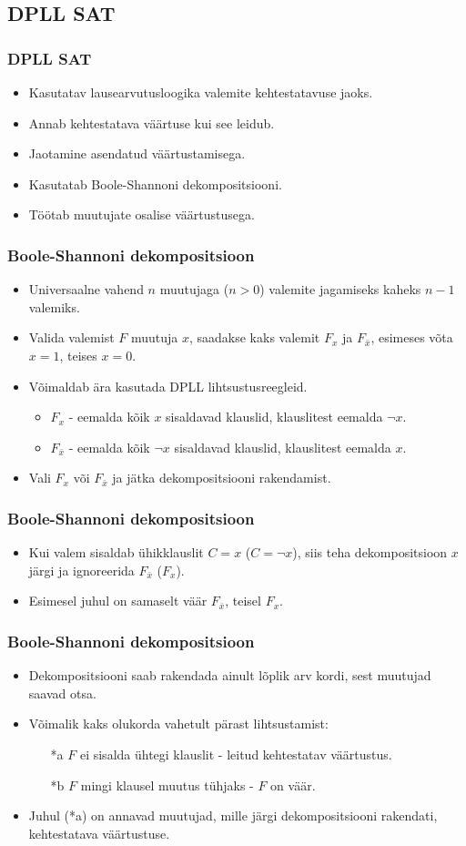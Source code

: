 \documentclass{beamer}
\begin{document}
\subsection{DPLL SAT}
\frame
{
	\frametitle{DPLL SAT}
	
	\begin{itemize}
		\item Kasutatav lausearvutusloogika valemite kehtestatavuse jaoks.
		\item Annab kehtestatava väärtuse kui see leidub.
		\item Jaotamine asendatud väärtustamisega.
		\item Kasutatab Boole-Shannoni dekompositsiooni.
		\item Töötab muutujate osalise väärtustusega.
	\end{itemize}
}
\frame
{
	\frametitle{Boole-Shannoni dekompositsioon}
	
	\begin{itemize}
		\item Universaalne vahend $n$ muutujaga ($n > 0$) valemite
		jagamiseks kaheks $n-1$ valemiks.
		\item Valida valemist $F$ muutuja $x$, saadakse kaks valemit $F_x$ ja $F_{\bar{x}}$,
		esimeses võta $x=1$, teises $x=0$.
		\item Võimaldab ära kasutada DPLL lihtsustusreegleid.
		\begin{itemize}
			\item $F_x$ - eemalda kõik $x$ sisaldavad klauslid, klauslitest eemalda $\neg x$.
			\item $F_{\bar{x}}$ - eemalda kõik $\neg x$ sisaldavad klauslid, klauslitest eemalda $x$.
		\end{itemize}
		\item Vali $F_x$ või $F_{\bar{x}}$ ja jätka dekompositsiooni rakendamist.
	\end{itemize}
}
\frame
{
	\frametitle{Boole-Shannoni dekompositsioon}
	
	\begin{itemize}
		\item Kui valem sisaldab ühikklauslit $C=x$ ($C=\neg x$),
		siis teha dekompositsioon $x$ järgi ja ignoreerida $F_{\bar{x}}$ ($F_x$).
		\item Esimesel juhul on samaselt väär $F_{\bar{x}}$, teisel $F_x$.
	\end{itemize}
}
\frame
{
	\frametitle{Boole-Shannoni dekompositsioon}
	
	\begin{itemize}
		\item Dekompositsiooni saab rakendada ainult lõplik arv kordi, sest muutujad saavad otsa.
		\item Võimalik kaks olukorda vahetult pärast lihtsustamist:
		\begin{enumerate}
			\item[*a] $F$ ei sisalda ühtegi klauslit - leitud kehtestatav väärtustus.
			\item[*b] $F$ mingi klausel muutus tühjaks - $F$ on väär.
		\end{enumerate}
		\item Juhul (*a) on annavad muutujad, mille järgi dekompositsiooni rakendati, kehtestatava väärtustuse.
	\end{itemize}
}
\end{document}
